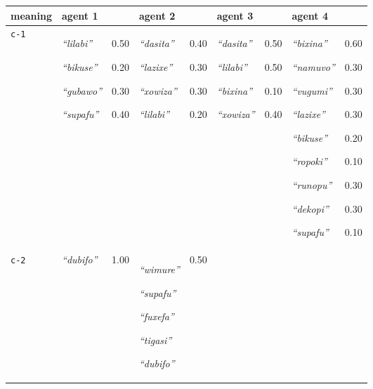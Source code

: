 
{\renewcommand{\arraystretch}{1.5}
\begin{tabular}{@{}p{1.2cm}|p{1.6cm}@{}p{0.8cm}@{}|p{1.6cm}@{}p{0.8cm}@{}|p{1.6cm}@{}p{0.8cm}@{}|p{1.6cm}@{}p{0.8cm}@{}}
meaning & agent 1 &  & agent 2 &  & agent 3 &  & agent 4 & \\
\hline
\texttt{c-1}&\textit{``lilabi''}


\textit{``bikuse''}


\textit{``gubawo''}


\textit{``supafu''}
&0.50

0.20

0.30

0.40&\textit{``dasita''}


\textit{``lazixe''}


\textit{``xowiza''}


\textit{``lilabi''}
&0.40

0.30

0.30

0.20&\textit{``dasita''}


\textit{``lilabi''}


\textit{``bixina''}


\textit{``xowiza''}
&0.50

0.50

0.10

0.40&\textit{``bixina''}


\textit{``namuvo''}


\textit{``vugumi''}


\textit{``lazixe''}


\textit{``bikuse''}


\textit{``ropoki''}


\textit{``runopu''}


\textit{``dekopi''}


\textit{``supafu''}
&0.60

0.30

0.30

0.30

0.20

0.10

0.30

0.30

0.10\\
\hline
\texttt{c-2}&\textit{``dubifo''}
&1.00&\textit{``wimure''}


\textit{``supafu''}


\textit{``fuxefa''}


\textit{``tigasi''}


\textit{``dubifo''}
&0.50


\end{tabular}}
